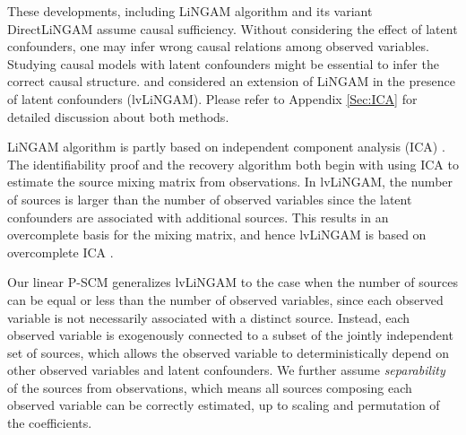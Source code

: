\documentclass[12pt]{article}
\begin{document}
These developments, including LiNGAM algorithm \citep{shimizu2006linear} and its variant DirectLiNGAM \citep{shimizu2011directlingam} assume causal sufficiency. Without considering the effect of latent confounders, one may infer wrong causal relations among observed variables. Studying causal models with latent confounders might be essential to infer the correct causal structure. \citet{hoyer2008estimation} and \citet{salehkaleybar2020learning} considered an extension of LiNGAM in the presence of latent confounders (lvLiNGAM). Please refer to Appendix \ref{Sec:ICA} for detailed discussion about both methods.

LiNGAM algorithm is partly based on independent component analysis (ICA) \citep{comon1994independent,hyvarinen2002independent}. The identifiability proof and the recovery algorithm both begin with using ICA to estimate the source mixing matrix from observations. In lvLiNGAM, the number of sources is larger than the number of observed variables since the latent confounders are associated with additional sources. This results in an overcomplete basis for the mixing matrix, and hence lvLiNGAM is based on overcomplete ICA \citep{lewicki2000learning,eriksson2004identifiability}. 

Our linear P-SCM generalizes lvLiNGAM to the case when 
the number of sources can be equal or less than the number of observed variables, since each observed variable is not necessarily associated with a distinct source. Instead, each observed variable is exogenously connected to a subset of the jointly independent set of sources, which allows the observed variable to deterministically depend on other observed variables and latent confounders. We further assume {\it{separability}} of the sources from observations, which means all sources composing each observed variable can be correctly estimated, up to scaling and permutation of the coefficients. 
\end{document}
